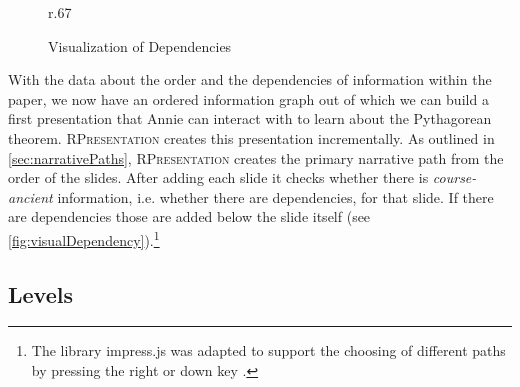 \documentclass{llncs}
\newcommand{\sys}{\textsc{RPresentation}\xspace}
\begin{document}
\begin{figure}r{.67\textwidth}\vspace{-2em}
  \vspace{-1.8em}
  \caption{Visualization of Dependencies}\label{fig:visualDependency}
  \vspace{-2em}
\end{figure}
With the data about the order and the dependencies of information within the paper, we now
have an ordered information graph out of which we can build a first presentation that
Annie can interact with to learn about the Pytha\-go\-rean theorem. \sys creates this
presentation incrementally. As outlined in \autoref{sec:narrativePaths}, \sys creates the primary narrative path from the order
of the slides. After adding each slide it checks whether there is \textit{course-ancient}
information, i.e. whether there are dependencies, for that slide. If there are
dependencies those are added below the slide itself (see
\autoref{fig:visualDependency}).\footnote{The library impress.js was adapted to support the
  choosing of different paths by pressing the right or down key
  \cite{npentrel:npentrel15}.}

\subsection{Levels}
\label{sec:levels}
\end{document}
